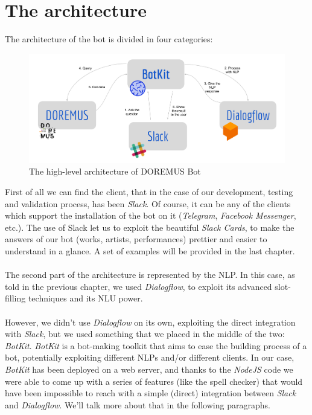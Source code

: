 \documentclass[a4paper,12pt]{report}
\begin{document}
	\section{The architecture}
	The architecture of the bot is divided in four categories:
	\begin{figure}[H]
		\centering
		\includegraphics[scale=0.2]{architecture}
		\caption{The high-level architecture of DOREMUS Bot}
	\end{figure}
	First of all we can find the client, that in the case of our development, testing and validation process, has been \textit{Slack}. Of course, it can be any of the clients which support the installation of the bot on it (\textit{Telegram}, \textit{Facebook Messenger}, etc.). The use of Slack let us to exploit the beautiful \textit{Slack Cards}, to make the answers of our bot (works, artists, performances) prettier and easier to understand in a glance. A set of examples will be provided in the last chapter.\\\\
	The second part of the architecture is represented by the NLP. In this case, as told in the previous chapter, we used \textit{Dialogflow}, to exploit its advanced slot-filling techniques and its NLU power.\\\\
	However, we didn't use \textit{Dialogflow} on its own, exploiting the direct integration with \textit{Slack}, but we used something that we placed in the middle of the two: \textit{BotKit}. \textit{BotKit} is a bot-making toolkit that aims to ease the building process of a bot, potentially exploiting different NLPs and/or different clients. In our case, \textit{BotKit} has been deployed on a web server, and thanks to the \textit{NodeJS} code we were able to come up with a series of features (like the spell checker) that would have been impossible to reach with a simple (direct) integration between \textit{Slack} and \textit{Dialogflow}. We'll talk more about that in the following paragraphs.\\\\
\end{document}
